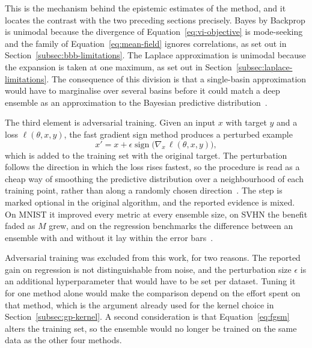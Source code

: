 This is the mechanism behind the epistemic estimates of the method, and it
locates the contrast with the two preceding sections precisely. Bayes by
Backprop is unimodal because the divergence of
Equation~\eqref{eq:vi-objective} is mode-seeking and the family of
Equation~\eqref{eq:mean-field} ignores correlations, as set out in
Section~\ref{subsec:bbb-limitations}. The Laplace approximation is unimodal
because the expansion is taken at one maximum, as set out in
Section~\ref{subsec:laplace-limitations}. The consequence of this division is
that a single-basin approximation would have to marginalise over several basins
before it could match a deep ensemble as an approximation to the Bayesian
predictive distribution~\cite{wilson2020}.

The third element is adversarial training. Given an input $x$ with target $y$
and a loss $\ell(\theta, x, y)$, the fast gradient sign method produces a
perturbed example
%
\begin{equation}
    x' = x + \epsilon \operatorname{sign}
      \bigl( \nabla_{x}\, \ell(\theta, x, y) \bigr) ,
    \label{eq:fgsm}
\end{equation}
%
which is added to the training set with the original target. The perturbation
follows the direction in which the loss rises fastest, so the procedure is read
as a cheap way of smoothing the predictive distribution over a neighbourhood of
each training point, rather than along a randomly chosen
direction~\cite{lakshminarayanan2017}. The step is marked optional in the
original algorithm, and the reported evidence is mixed. On MNIST it improved
every metric at every ensemble size, on SVHN the benefit faded as $M$ grew, and
on the regression benchmarks the difference between an ensemble with and without
it lay within the error bars~\cite{lakshminarayanan2017}.

Adversarial training was excluded from this work, for two reasons. The reported
gain on regression is not distinguishable from noise, and the perturbation size
$\epsilon$ is an additional hyperparameter that would have to be set per
dataset. Tuning it for one method alone would make the comparison depend on the
effort spent on that method, which is the argument already used for the kernel
choice in Section~\ref{subsec:gp-kernel}. A second consideration is that
Equation~\eqref{eq:fgsm} alters the training set, so the ensemble would no
longer be trained on the same data as the other four methods.

